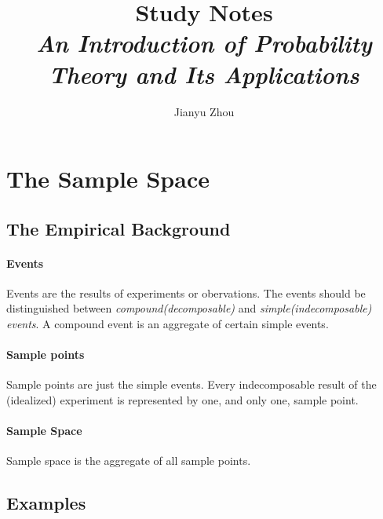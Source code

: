 \documentclass{article}
\author{Jianyu Zhou}
\title{\textbf{Study Notes}\\ \textit{An Introduction of Probability Theory and Its Applications}}
\begin{document}
	\maketitle
	\section{The Sample Space}
	\subsection{The Empirical Background}
	\paragraph{Events} Events are the results of experiments or obervations.
	The events should be distinguished between \textit{compound(decomposable)} and \textit{simple(indecomposable) events}. A compound event is an aggregate of certain simple events.
	\paragraph{Sample points} Sample points are just the simple events. Every indecomposable result of the (idealized) experiment is represented by one, and only one, sample point.
	\paragraph{Sample Space} Sample space is the aggregate of all sample points.
	\subsection{Examples}
\end{document}
